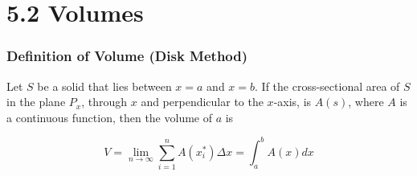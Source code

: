 %
%

\section*{5.2 Volumes}

\subsubsection*{Definition of Volume (Disk Method)}

Let \(S\) be a solid that lies between \(x=a\) and \(x=b\). If the cross-sectional area of \(S\) in the plane \(P_x\), through \(x\) and perpendicular to the \(x\)-axis, is \(A(s)\), where \(A\) is a continuous function, then the volume of \(a\) is 

\[ V = \lim_{n \to \infty} \sum_{i=1}^n A(x_i^*) \Delta x = \int_a^b A(x) dx\]
